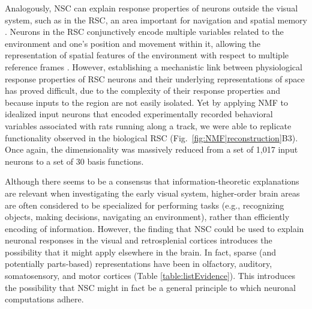 Analogously, \ac{NSC} can explain response properties
of neurons outside the visual system, 
such as in the \acf{RSC}, an area important for navigation and spatial memory \cite{Miller2014,Nelson2015,VannAggleton2009}.
Neurons in the \ac{RSC} conjunctively encode multiple variables related to 
the environment and one's position and movement within it,
allowing the representation of spatial features of the environment 
with respect to multiple reference frames \cite{AlexanderNitz2015}.
However, establishing a mechanistic link 
between physiological response properties of \ac{RSC} neurons 
and their underlying representations of space
has proved difficult,
due to the complexity of their response properties and because inputs to the region are not easily isolated.
Yet by applying \ac{NMF} to idealized input neurons that encoded 
experimentally recorded behavioral variables 
associated with rats running along a track, we were able to replicate
functionality observed in the biological \ac{RSC} (Fig.~\ref{fig:NMF|reconstruction}B3).
Once again, the dimensionality was massively reduced from a set of 1,017 input neurons to a set of 30 basis functions.

Although there seems to be a consensus that information-theoretic explanations are relevant when investigating the early visual system,
higher-order brain areas are often considered to be specialized for
performing tasks
(e.g., recognizing objects, making decisions, navigating an environment),
rather than efficiently encoding of information.
However, the finding that \ac{NSC} could be used to explain
neuronal responses in the visual and retrosplenial cortices
introduces the possibility that it might apply elsewhere in the brain.
In fact, sparse
(and potentially parts-based)
representations have been in 
olfactory, auditory, somatosensory, 
and motor cortices
(Table \ref{table:listEvidence}). 
This introduces the possibility that \ac{NSC} might in fact
be a general principle to which neuronal computations adhere.

